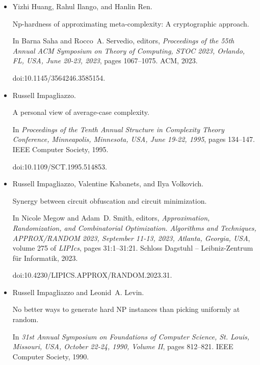 \documentclass[10pt,a4paper]{article}
\begin{document}
\begin{itemize}
\item[] 
[21]

Yizhi Huang, Rahul Ilango, and Hanlin Ren.


Np-hardness of approximating meta-complexity: A cryptographic
approach.


In Barna Saha and Rocco A. Servedio, editors, \emph{Proceedings of the
55th Annual ACM Symposium on Theory of Computing, STOC 2023, Orlando, FL,
USA, June 20-23, 2023}, pages 1067–1075. ACM, 2023.


doi:10.1145/3564246.3585154.





\item[] 
[22]

Russell Impagliazzo.


A personal view of average-case complexity.


In \emph{Proceedings of the Tenth Annual Structure in Complexity
Theory Conference, Minneapolis, Minnesota, USA, June 19-22, 1995}, pages
134–147. IEEE Computer Society, 1995.


doi:10.1109/SCT.1995.514853.





\item[] 
[23]

Russell Impagliazzo, Valentine Kabanets, and Ilya Volkovich.


Synergy between circuit obfuscation and circuit minimization.


In Nicole Megow and Adam D. Smith, editors, \emph{Approximation,
Randomization, and Combinatorial Optimization. Algorithms and Techniques,
APPROX/RANDOM 2023, September 11-13, 2023, Atlanta, Georgia, USA}, volume
275 of \emph{LIPIcs}, pages 31:1–31:21. Schloss Dagstuhl – Leibniz-Zentrum
für Informatik, 2023.


doi:10.4230/LIPICS.APPROX/RANDOM.2023.31.





\item[] 
[24]

Russell Impagliazzo and Leonid A. Levin.


No better ways to generate hard NP instances than picking uniformly
at random.


In \emph{31st Annual Symposium on Foundations of Computer Science, St.
Louis, Missouri, USA, October 22-24, 1990, Volume II}, pages 812–821.
IEEE Computer Society, 1990.



\end{itemize}
\end{document}
